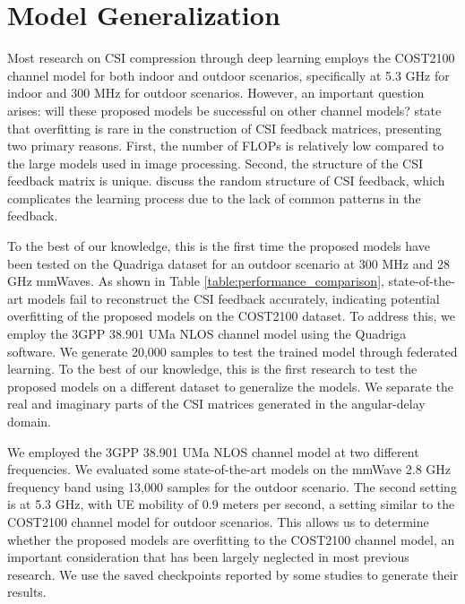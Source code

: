 \documentclass[lettersize,journal]{IEEEtran}
\begin{document}
\section{Model Generalization}

Most research on CSI compression through deep learning employs the COST2100 channel model for both indoor and outdoor scenarios, specifically at 5.3 GHz for indoor and 300 MHz for outdoor scenarios. However, an important question arises: will these proposed models be successful on other channel models?
\cite{abn} state that overfitting is rare in the construction of CSI feedback matrices, presenting two primary reasons. First, the number of FLOPs is relatively low compared to the large models used in image processing. Second, the structure of the CSI feedback matrix is unique. \cite{abx} discuss the random structure of CSI feedback, which complicates the learning process due to the lack of common patterns in the feedback.

To the best of our knowledge, this is the first time the proposed models have been tested on the Quadriga dataset for an outdoor scenario at 300 MHz and 28 GHz mmWaves. As shown in Table
 \ref{table:performance_comparison}, state-of-the-art models fail to reconstruct the CSI feedback accurately, indicating potential overfitting of the proposed models on the COST2100 dataset. To address this, we employ the 3GPP 38.901 UMa NLOS channel model using the Quadriga software. We generate 20,000 samples to test the trained model through federated learning. To the best of our knowledge, this is the first research to test the proposed models on a different dataset to generalize the models. We separate the real and imaginary parts of the CSI matrices generated in the angular-delay domain.

We employed the 3GPP 38.901 UMa NLOS channel model at two different frequencies. We evaluated some state-of-the-art models on the mmWave 2.8 GHz frequency band using 13,000 samples for the outdoor scenario. The second setting is at 5.3 GHz, with UE mobility of 0.9 meters per second, a setting similar to the COST2100 channel model for outdoor scenarios. This allows us to determine whether the proposed models are overfitting to the COST2100 channel model, an important consideration that has been largely neglected in most previous research. We use the saved checkpoints reported by some studies to generate their results.

    
\end{document}
